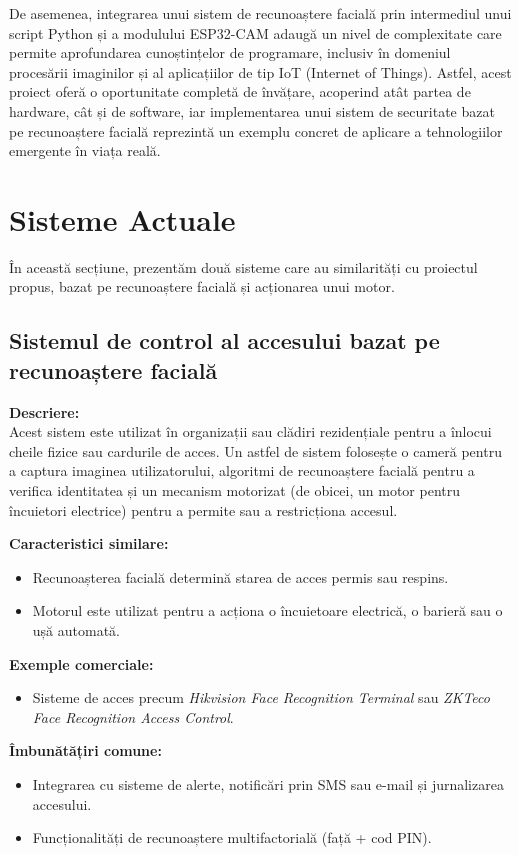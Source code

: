 \documentclass[a4paper,12pt]{report}
\begin{document}
De asemenea, integrarea unui sistem de recunoaștere facială prin intermediul unui script Python și a modulului ESP32-CAM adaugă un nivel de complexitate care permite aprofundarea cunoștințelor de programare, inclusiv în domeniul procesării imaginilor și al aplicațiilor de tip IoT (Internet of Things). Astfel, acest proiect oferă o oportunitate completă de învățare, acoperind atât partea de hardware, cât și de software, iar implementarea unui sistem de securitate bazat pe recunoaștere facială reprezintă un exemplu concret de aplicare a tehnologiilor emergente în viața reală.

\section{Sisteme Actuale}

În această secțiune, prezentăm două sisteme care au similarități cu proiectul propus, bazat pe recunoaștere facială și acționarea unui motor.

\subsection{Sistemul de control al accesului bazat pe recunoaștere facială}
\textbf{Descriere:} \\
Acest sistem este utilizat în organizații sau clădiri rezidențiale pentru a înlocui cheile fizice sau cardurile de acces. Un astfel de sistem folosește o cameră pentru a captura imaginea utilizatorului, algoritmi de recunoaștere facială pentru a verifica identitatea și un mecanism motorizat (de obicei, un motor pentru încuietori electrice) pentru a permite sau a restricționa accesul.

\textbf{Caracteristici similare:}
\begin{itemize}
    \item Recunoașterea facială determină starea de acces permis sau respins.
    \item Motorul este utilizat pentru a acționa o încuietoare electrică, o barieră sau o ușă automată.
\end{itemize}

\textbf{Exemple comerciale:}
\begin{itemize}
    \item Sisteme de acces precum \textit{Hikvision Face Recognition Terminal} sau \textit{ZKTeco Face Recognition Access Control}.
\end{itemize}

\textbf{Îmbunătățiri comune:}
\begin{itemize}
    \item Integrarea cu sisteme de alerte, notificări prin SMS sau e-mail și jurnalizarea accesului.
    \item Funcționalități de recunoaștere multifactorială (față + cod PIN).
\end{itemize}
\end{document}
